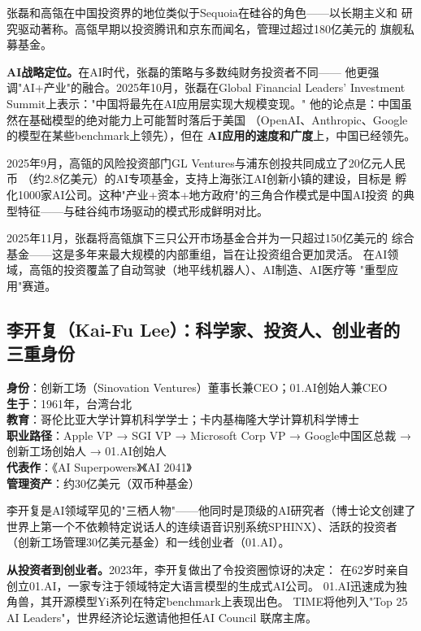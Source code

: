 张磊和高瓴在中国投资界的地位类似于Sequoia在硅谷的角色——以长期主义和
研究驱动著称。高瓴早期以投资腾讯和京东而闻名，管理过超过180亿美元的
旗舰私募基金。

\textbf{AI战略定位。}在AI时代，张磊的策略与多数纯财务投资者不同——
他更强调"AI+产业"的融合。2025年10月，张磊在Global Financial Leaders'
Investment Summit上表示："中国将最先在AI应用层实现大规模变现。"
他的论点是：中国虽然在基础模型的绝对能力上可能暂时落后于美国
（OpenAI、Anthropic、Google的模型在某些benchmark上领先），但在
\textbf{AI应用的速度和广度}上，中国已经领先。

2025年9月，高瓴的风险投资部门GL Ventures与浦东创投共同成立了20亿元人民币
（约2.8亿美元）的AI专项基金，支持上海张江AI创新小镇的建设，目标是
孵化1000家AI公司。这种"产业+资本+地方政府"的三角合作模式是中国AI投资
的典型特征——与硅谷纯市场驱动的模式形成鲜明对比。

2025年11月，张磊将高瓴旗下三只公开市场基金合并为一只超过150亿美元的
综合基金——这是多年来最大规模的内部重组，旨在让投资组合更加灵活。
在AI领域，高瓴的投资覆盖了自动驾驶（地平线机器人）、AI制造、AI医疗等
"重型应用"赛道。


\subsection{李开复（Kai-Fu Lee）：科学家、投资人、创业者的三重身份}
\label{subsec:inv-kaifulee}

\begin{corebox}
\textbf{身份}：创新工场（Sinovation Ventures）董事长兼CEO；01.AI创始人兼CEO \\
\textbf{生于}：1961年，台湾台北 \\
\textbf{教育}：哥伦比亚大学计算机科学学士；卡内基梅隆大学计算机科学博士 \\
\textbf{职业路径}：Apple VP → SGI VP → Microsoft Corp VP →
  Google中国区总裁 → 创新工场创始人 → 01.AI创始人 \\
\textbf{代表作}：《AI Superpowers》《AI 2041》 \\
\textbf{管理资产}：约30亿美元（双币种基金）
\end{corebox}

李开复是AI领域罕见的"三栖人物"——他同时是顶级的AI研究者（博士论文创建了
世界上第一个不依赖特定说话人的连续语音识别系统SPHINX）、活跃的投资者
（创新工场管理30亿美元基金）和一线创业者（01.AI）。

\textbf{从投资者到创业者。}2023年，李开复做出了令投资圈惊讶的决定：
在62岁时亲自创立01.AI，一家专注于领域特定大语言模型的生成式AI公司。
01.AI迅速成为独角兽，其开源模型Yi系列在特定benchmark上表现出色。
TIME将他列入"Top 25 AI Leaders"，世界经济论坛邀请他担任AI Council
联席主席。

